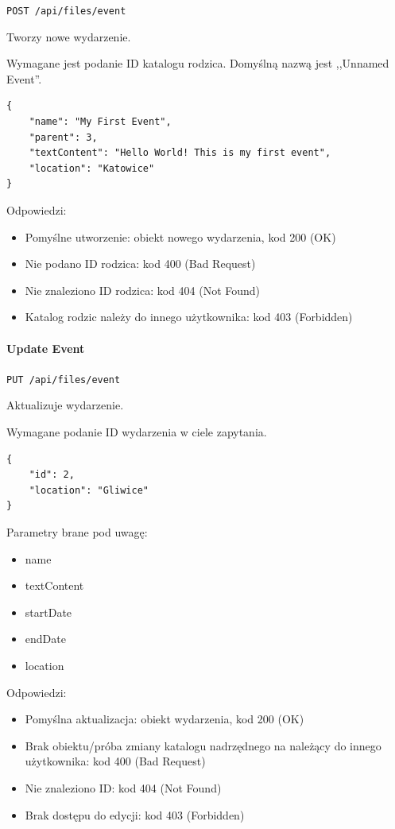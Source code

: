 \documentclass[a4paper,twoside,12pt]{book}
\begin{document}
\texttt{POST /api/files/event}

Tworzy nowe wydarzenie.

Wymagane jest podanie ID katalogu rodzica. Domyślną nazwą jest ,,Unnamed Event''.

\begin{verbatim}
{
    "name": "My First Event",
    "parent": 3,
    "textContent": "Hello World! This is my first event",
    "location": "Katowice"
}
\end{verbatim}

Odpowiedzi: 
\begin{itemize}
	\item Pomyślne utworzenie: obiekt nowego wydarzenia, kod 200 (OK) 
	\item Nie podano ID rodzica: kod 400 (Bad Request)
	\item Nie znaleziono ID rodzica: kod 404 (Not Found) 
	\item Katalog rodzic należy do innego użytkownika: kod 403 (Forbidden)
\end{itemize}

\paragraph{Update Event}

\texttt{PUT /api/files/event}

Aktualizuje wydarzenie.

Wymagane podanie ID wydarzenia w ciele zapytania.

\begin{verbatim}
{
    "id": 2,
    "location": "Gliwice"
}
\end{verbatim}

Parametry brane pod uwagę: 
\begin{itemize}
	\item  name \item  textContent \item  startDate \item  endDate \item location
\end{itemize}

Odpowiedzi: 
\begin{itemize}
	\item Pomyślna aktualizacja: obiekt wydarzenia, kod 200 (OK) 
	\item Brak obiektu/próba zmiany katalogu nadrzędnego na należący do innego użytkownika: kod 400 (Bad Request) 
	\item Nie znaleziono ID: kod 404 (Not Found) 
	\item Brak dostępu do edycji: kod 403 (Forbidden)
\end{itemize}
\end{document}
